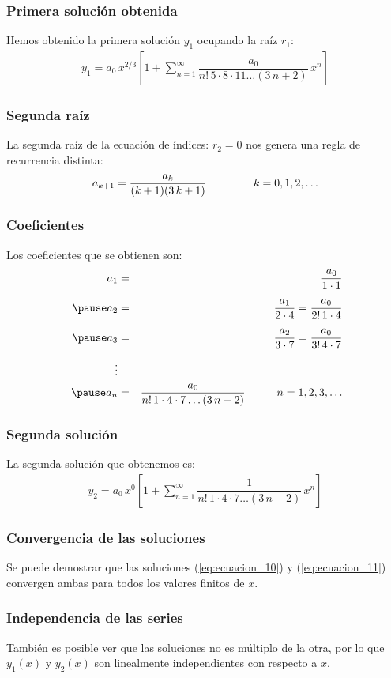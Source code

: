 \begin{frame}
\frametitle{Primera solución obtenida}
Hemos obtenido la primera solución $y_{1}$ ocupando la raíz $r_{1}$:
\begin{align}
y_{1} = a_{0} \, x^{2/3} \left[ 1 + \sum_{n=1}^{\infty} \dfrac{a_{0}}{n! \, 5 \cdot 8 \cdot 11 \ldots (3\, n + 2)} \, x^{n} \right]
\label{eq:ecuacion_10}    
\end{align}
\end{frame}
\begin{frame}
\frametitle{Segunda raíz}
La segunda raíz de la ecuación de índices: $r_{2} = 0$ nos genera una regla de recurrencia distinta:
\begin{align}
a_{k+1} = \dfrac{a_{k}}{(k+1)(3 \, k +1)} \hspace{1.5cm} k = 0, 1, 2, \ldots
\label{eq:ecuacion_09}    
\end{align}
\end{frame}
\begin{frame}
\frametitle{Coeficientes}
Los coeficientes que se obtienen son:
\begin{eqnarray*}
a_{1} &=& \dfrac{a_{0}}{1 \cdot 1} \\[0.5em] \pause
a_{2} &=& \dfrac{a_{1}}{2 \cdot 4} = \dfrac{a_{0}}{2! \, 1 \cdot 4}  \\[0.5em] \pause
a_{3} &=& \dfrac{a_{2}}{3 \cdot 7} = \dfrac{a_{0}}{3! \, 4 \cdot 7}  \\[0.5em]
\vdots \\ \pause
a_{n} &=& \dfrac{a_{0}}{n! \, 1 \cdot 4 \cdot 7 \ldots (3 \, n - 2)} \hspace{1cm} n = 1, 2, 3, \ldots
\end{eqnarray*}
\end{frame}
\begin{frame}
\frametitle{Segunda solución}
La segunda solución que obtenemos es:
\begin{align}
y_{2} = a_{0} \, x^{0} \left[ 1 + \sum_{n=1}^{\infty} \dfrac{1}{n! \, 1 \cdot 4 \cdot 7 \ldots (3\, n - 2)} \, x^{n} \right]
\label{eq:ecuacion_11}
\end{align}    
\end{frame}
\begin{frame}
\frametitle{Convergencia de las soluciones}
Se puede demostrar que las soluciones (\ref{eq:ecuacion_10}) y (\ref{eq:ecuacion_11}) convergen ambas para todos los valores finitos de $x$.
\end{frame}
\begin{frame}
\frametitle{Independencia de las series}
También es posible ver que las soluciones no es múltiplo de la otra, por lo que $y_{1}(x)$ y $y_{2}(x)$ son linealmente independientes con respecto a $x$.
\end{frame}
